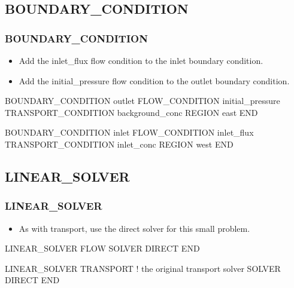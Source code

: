 \documentclass{beamer}
\newcommand\redcomment[1]{{{\color{red} #1}}}
\newcommand\bluecomment[1]{{{\color{blue} #1}}}
\newcommand\greencomment[1]{{{\color{green} #1}}}
\newcommand\magentacomment[1]{{{\color{magenta} #1}}}
\begin{document}
\subsection{BOUNDARY\_CONDITION}

\begin{frame}[fragile]\frametitle{BOUNDARY\_CONDITION}

\begin{itemize}
\item Add the \greencomment{inlet\_flux} flow condition to the \redcomment{inlet} boundary condition.
\item Add the \greencomment{initial\_pressure} flow condition to the \redcomment{outlet} boundary condition.
\end{itemize}

\begin{semiverbatim}

BOUNDARY_CONDITION outlet
  \magentacomment{FLOW_CONDITION initial_pressure}
  TRANSPORT_CONDITION background_conc
  REGION east
END

BOUNDARY_CONDITION inlet
  \magentacomment{FLOW_CONDITION inlet_flux}
  TRANSPORT_CONDITION inlet_conc
  REGION west
END

\end{semiverbatim}

\end{frame}

\subsection{LINEAR\_SOLVER}

\begin{frame}[fragile]\frametitle{LINEAR\_SOLVER}

\begin{itemize}
\item As with transport, use the direct solver for this small problem.
\end{itemize}


\begin{semiverbatim}

\magentacomment{LINEAR_SOLVER FLOW}
  \magentacomment{SOLVER DIRECT}
\magentacomment{END}

LINEAR_SOLVER TRANSPORT  \bluecomment{! the original transport solver}
  SOLVER DIRECT
END
\end{semiverbatim}

\end{frame}
\end{document}
